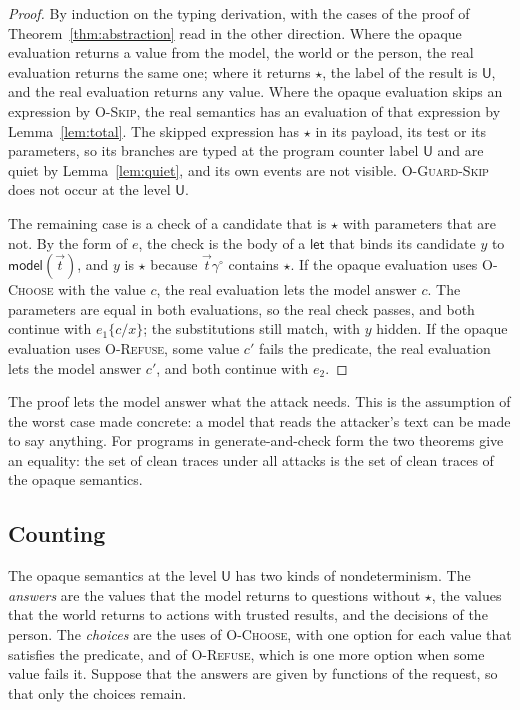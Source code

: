 \documentclass[acmsmall,nonacm,screen]{acmart}
\newcommand{\kw}[1]{\mathsf{#1}}
\newcommand{\U}{\kw{U}}
\newcommand{\model}[1]{\kw{model}(#1)}
\newcommand{\op}{\star}
\begin{document}
\begin{proof}
By induction on the typing derivation, with the cases of the proof of
Theorem~\ref{thm:abstraction} read in the other direction. Where the opaque evaluation
returns a value from the model, the world or the person, the real evaluation returns the
same one; where it returns $\op$, the label of the result is $\U$, and the real evaluation
returns any value. Where the opaque evaluation skips an expression by \textsc{O-Skip}, the
real semantics has an evaluation of that expression by Lemma~\ref{lem:total}. The skipped
expression has $\op$ in its payload, its test or its parameters, so its branches are typed
at the program counter label $\U$ and are quiet by Lemma~\ref{lem:quiet}, and its own events
are not visible. \textsc{O-Guard-Skip} does not occur at the level $\U$.

The remaining case is a check of a candidate that is $\op$ with parameters that are not. By
the form of $e$, the check is the body of a $\kw{let}$ that binds its candidate $y$ to
$\model{\vec t}$, and $y$ is $\op$ because $\vec t\gamma^\circ$ contains $\op$. If the opaque
evaluation uses \textsc{O-Choose} with the value $c$, the real evaluation lets the model
answer $c$. The parameters are equal in both evaluations, so the real check passes, and both
continue with $e_1\{c/x\}$; the substitutions still match, with $y$ hidden. If the opaque
evaluation uses \textsc{O-Refuse}, some value $c'$ fails the predicate, the real evaluation
lets the model answer $c'$, and both continue with $e_2$.
\end{proof}

The proof lets the model answer what the attack needs. This is the assumption of the worst
case made concrete: a model that reads the attacker's text can be made to say anything. For
programs in generate-and-check form the two theorems give an equality: the set of clean
traces under all attacks is the set of clean traces of the opaque semantics.

\subsection{Counting}

The opaque semantics at the level $\U$ has two kinds of nondeterminism. The \emph{answers}
are the values that the model returns to questions without $\op$, the values that the world
returns to actions with trusted results, and the decisions of the person. The \emph{choices}
are the uses of \textsc{O-Choose}, with one option for each value that satisfies the
predicate, and of \textsc{O-Refuse}, which is one more option when some value fails it.
Suppose that the answers are given by functions of the request, so that only the choices
remain.
\end{document}
